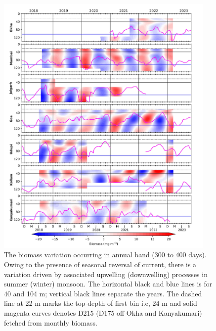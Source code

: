 \documentclass[authoryear,review,12pt]{elsarticle}
\begin{document}
\begin{figure}[htbp]
	\centering
	\includegraphics[width=0.95\textwidth]{./figures/annual_300_400_451_1.jpeg} 
	\captionsetup{justification=justified,font=footnotesize,skip=0.05\baselineskip,width=\textwidth}
	\caption{The biomass variation occurring in annual band (300 to 400 days). Owing to the presence of seasonal reversal of current, there is a variation driven by associated upwelling (downwelling) processes in summer (winter) monsoon. The horizontal black and blue lines is for 40 and 104 m; vertical black lines separate the years. The dashed line at 22 m marks the top-depth of first bin i.e, 24 m and solid magenta curves denotes D215 (D175 off Okha and Kanyakumari) fetched from monthly biomass.}
	\label{fig:annual}
\end{figure}
\end{document}
